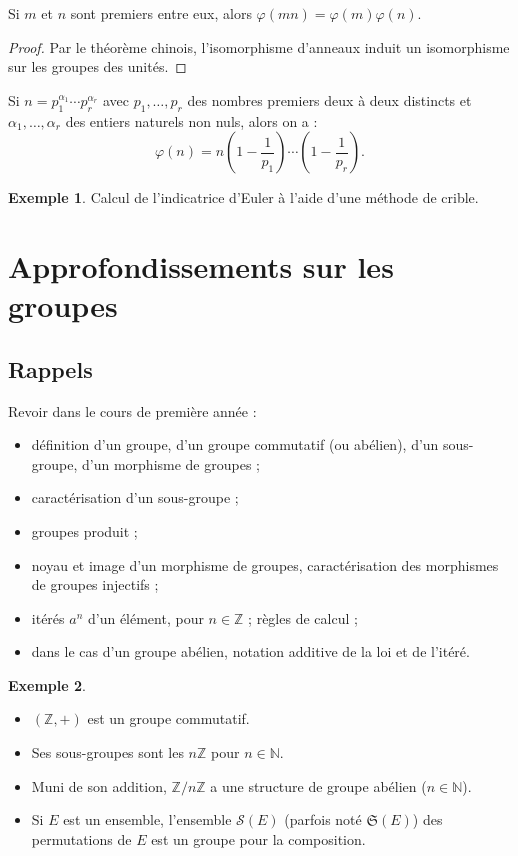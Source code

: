 \documentclass[french]{article}
\newcommand{\N}{\mathbb{N}}
\newcommand{\Z}{\mathbb{Z}}
\theoremstyle{plain}
\theoremstyle{definition}
\newtheorem*{ex}{Exemple}
\theoremstyle{remark}
\begin{document}
\begin{prop}%
	Si $m$ et $n$ sont premiers entre eux, alors $\varphi(mn)=\varphi(m)\varphi(n)$.
\end{prop}
\begin{proof}
	Par le théorème chinois, l'isomorphisme d'anneaux induit un isomorphisme sur les groupes des unités.
\end{proof}

\begin{prop}
	Si $n=p_1^{\alpha_1}\cdots p_r^{\alpha_r}$ avec $p_1,\ldots,p_r$ des nombres premiers deux à deux distincts et $\alpha_1,\ldots,\alpha_r$ des entiers naturels non nuls, alors on a : 
	$$\varphi(n)=n\left(1-\frac{1}{p_1}\right)\cdots\left(1-\frac{1}{p_r}\right).$$
\end{prop}

\begin{ex}
	Calcul de l'indicatrice d'Euler à l'aide d'une méthode de crible.
\end{ex}

\section{Approfondissements sur les groupes}

\subsection{Rappels}

Revoir dans le cours de première année :
\begin{itemize}
	\item définition d'un groupe, d'un groupe commutatif (ou abélien), d'un sous-groupe, d'un morphisme de groupes ;
	\item caractérisation d'un sous-groupe ;
	\item groupes produit ;
	\item noyau et image d'un morphisme de groupes, caractérisation des morphismes de groupes injectifs ;
	\item itérés $a^n$ d'un élément, pour $n\in\Z$ ; règles de calcul ;
	\item dans le cas d'un groupe abélien, notation additive de la loi et de l'itéré.
\end{itemize}

\begin{ex}
	\begin{itemize}
		\item $(\Z,+)$ est un groupe commutatif.
		\item Ses sous-groupes sont les $n\Z$ pour $n\in\N$.
		\item Muni de son addition, $\Z/n\Z$ a une structure de groupe abélien ($n\in\N$).
		\item Si $E$ est un ensemble, l'ensemble $\mathcal{S}(E)$ (parfois noté $\mathfrak{S}(E)$) des permutations de $E$ est un groupe pour la composition.
	\end{itemize}
\end{ex}
\end{document}
